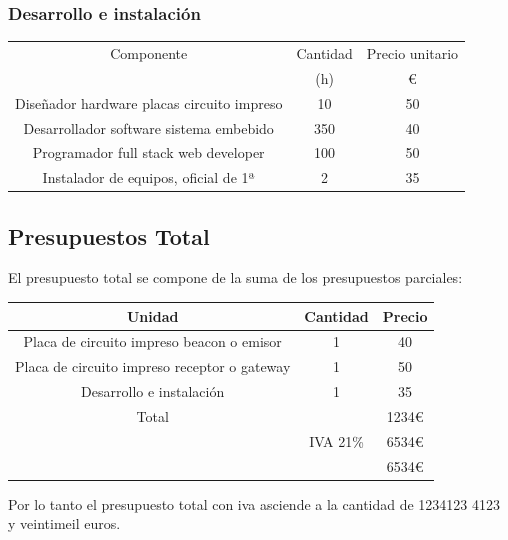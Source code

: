 \documentclass[a4paper ,12pt, onecolumn]{article}
\begin{document}
            \subsubsection{Desarrollo e instalación}
            \begin{center}
                \begin{tabular}{||c | c |c ||} 
                \hline
                Componente & Cantidad  & Precio unitario  \\ [0.5ex] 
                 & (h) & € \\ [0.5ex] 
                \hline\hline
                Diseñador hardware placas circuito impreso   & 10  & 50 \\ 
                Desarrollador  software sistema embebido     & 350 & 40 \\ 
                Programador full stack web developer         & 100 & 50 \\ 
                Instalador de equipos, oficial de 1ª         & 2   & 35 \\ 
                \hline
                \end{tabular}
            \end{center}
    \subsection{Presupuestos Total}
        El presupuesto total se compone de la suma de los presupuestos parciales:
        \begin{center}
            \begin{tabular}{||c | c |c ||} 
            \hline
            Unidad & Cantidad & Precio  \\ [0.5ex] 
            \hline\hline
            Placa de circuito impreso beacon o emisor & 1 & 40 \\ 
            Placa de circuito impreso receptor o gateway & 1 & 50 \\ 
            Desarrollo e instalación & 1 & 35 \\ 
            \hline
            \hline
            Total &  & 1234€ \\ 
             & IVA 21\%& 6534€ \\ 
             & & 6534€ \\ 
            \hline
            \end{tabular}
        \end{center}
        Por lo tanto el presupuesto total con iva asciende a la cantidad de 1234123 4123 y veintimeil euros.
\end{document}
